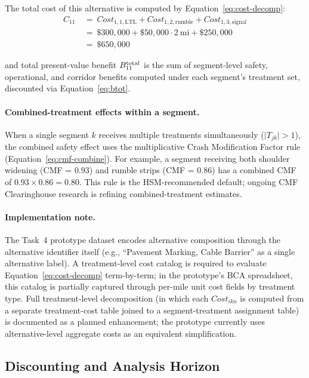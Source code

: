 \noindent The total cost of this alternative is computed by
Equation~\ref{eq:cost-decomp}:
\begin{align*}
C_{11}\ &=\ \mathit{Cost}_{1,1,\text{LTL}} + \mathit{Cost}_{1,2,\text{rumble}} + \mathit{Cost}_{1,3,\text{signal}} \\
       &=\ \$300{,}000 + \$50{,}000 \cdot 2\ \text{mi} + \$250{,}000 \\
       &=\ \$650{,}000
\end{align*}

\noindent and total present-value benefit $B^{\mathrm{total}}_{11}$ is the sum of
segment-level safety, operational, and corridor benefits computed under
each segment's treatment set, discounted via Equation~\ref{eq:btot}.

\paragraph{Combined-treatment effects within a segment.} When a single
segment $k$ receives multiple treatments simultaneously
($\lvert T_{jk} \rvert > 1$), the combined safety effect uses the
multiplicative Crash Modification Factor rule
(Equation~\ref{eq:cmf-combine}). For example, a segment receiving both
shoulder widening (CMF = $0.93$) and rumble strips (CMF = $0.86$) has a
combined CMF of $0.93 \times 0.86 = 0.80$. This rule is the HSM-recommended
default; ongoing CMF Clearinghouse research is refining combined-treatment
estimates.

\paragraph{Implementation note.} The Task~4 prototype dataset encodes
alternative composition through the alternative identifier itself
(e.g., ``Pavement Marking, Cable Barrier'' as a single alternative label).
A treatment-level cost catalog is required to evaluate
Equation~\ref{eq:cost-decomp} term-by-term; in the prototype's BCA
spreadsheet, this catalog is partially captured through per-mile unit cost
fields by treatment type. Full treatment-level decomposition (in which
each $\mathit{Cost}_{ikn}$ is computed from a separate treatment-cost table
joined to a segment-treatment assignment table) is documented as a planned
enhancement; the prototype currently uses alternative-level aggregate
costs as an equivalent simplification.

\subsection{Discounting and Analysis Horizon}
\label{sec:discounting}

